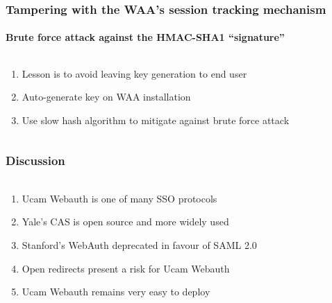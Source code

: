 \documentclass[handout, aspectratio=169, notes=hide]{beamer}
\begin{document}
\begin{frame}[fragile]
\frametitle{Tampering with the WAA's session tracking mechanism}
\framesubtitle{Brute force attack against the HMAC-SHA1 ``signature''}
\setlength{\parskip}{1.0em}
\begin{columns}[T]
\begin{column}[T]{1.0\textwidth}	
\setlength{\parskip}{1.0em}

\begin{enumerate}
\setlength{\parskip}{1.0em}
\item Lesson is to avoid leaving key generation to end user
\item Auto-generate key on WAA installation
\item Use slow hash algorithm to mitigate against brute force attack
\end{enumerate}
\end{column}

\begin{column}[T]{0.0\textwidth}
\end{column}
\end{columns}

\end{frame}
\note{
}


\begin{frame}
\frametitle{Discussion}
\framesubtitle{}
\setlength{\parskip}{1.0em}
\begin{columns}[T]
\begin{column}[T]{1.0\textwidth}	
\setlength{\parskip}{1.0em}

\begin{enumerate}
\setlength{\parskip}{1.0em}
\item Ucam Webauth is one of many SSO protocols
\item Yale's CAS is open source and more widely used
\item Stanford's WebAuth deprecated in favour of SAML 2.0
\item Open redirects present a risk for Ucam Webauth
\item Ucam Webauth remains very easy to deploy
\end{enumerate}
\end{column}

\begin{column}[T]{0.0\textwidth}
\end{column}
\end{columns}

\end{frame}
\note{
}
\end{document}
